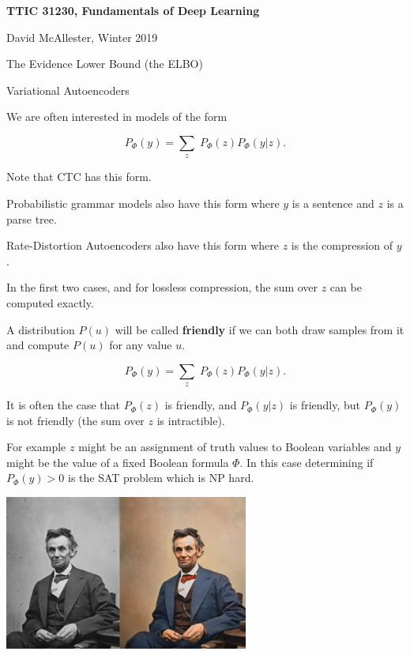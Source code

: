





{\Huge

  \centerline{\bf TTIC 31230, Fundamentals of Deep Learning}
  \bigskip
  \centerline{David McAllester, Winter 2019}
  \vfill
  \centerline{The Evidence Lower Bound (the ELBO)}
  \vfill
  \centerline{Variational Autoencoders}
  \vfill
  \vfill


We are often interested in models of the form

\vfill
$$P_\Phi(y) = \sum_z\;P_\Phi(z)P_\Phi(y|z).$$

\vfill
Note that CTC has this form.

\vfill
Probabilistic grammar models also have this form where $y$ is a sentence and $z$ is a parse tree.

\vfill
Rate-Distortion Autoencoders also have this form where $z$ is the compression of $y$.

\vfill
In the first two cases, and for lossless compression, the sum over $z$ can be computed exactly.


A distribution $P(u)$ will be called {\bf friendly} if we can both draw samples from it and compute $P(u)$ for any value $u$.

\vfill
$$P_\Phi(y) = \sum_z\;P_\Phi(z)P_\Phi(y|z).$$

\vfill
It is often the case that $P_\Phi(z)$ is friendly, and $P_\Phi(y|z)$ is friendly, but $P_\Phi(y)$ is not friendly (the sum over $z$ is intractible).

\vfill
For example $z$ might be an assignment of truth values to Boolean variables and $y$ might be the value of a fixed Boolean formula $\Phi$.  In this case
determining if $P_\Phi(y) > 0$ is the SAT problem which is NP hard.


\centerline{\includegraphics[height = 2in]{../images/Colorization}}

}
